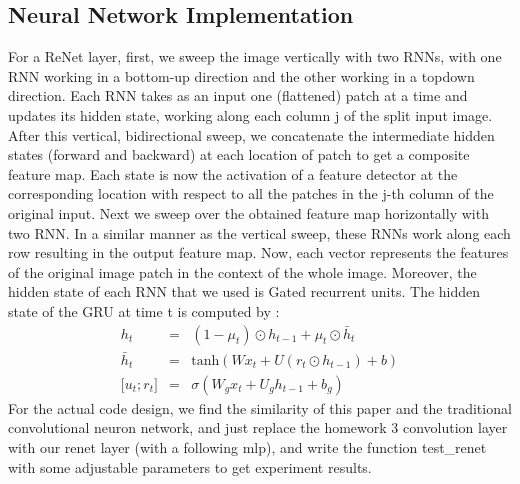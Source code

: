 \documentclass[final,leqno]{siamltex}
\begin{document}
\subsection{Neural Network Implementation}
For a ReNet layer, first, we sweep the image vertically with two RNNs, with one RNN working in a bottom-up direction and the other working in a topdown direction. Each RNN takes as an input one (flattened) patch at a time and updates its hidden state, working along each column j of the split input image. After this vertical, bidirectional sweep, we concatenate the intermediate hidden states (forward and backward) at each location of patch to get a composite feature map. Each state is now the activation of a feature detector at the corresponding location with respect to all the patches in the j-th column of the original input. Next we sweep over the obtained feature map horizontally with two RNN. In a similar manner as the vertical sweep, these RNNs work along each row resulting in the output feature map. Now, each vector represents the features of the original image patch in the context of the whole image. Moreover, the hidden state of each RNN that we used is Gated recurrent units. The hidden state of the GRU at time t is computed by \cite{DBLP:journals/corr/ChoMGBSB14}:
\begin{eqnarray*}
	h_t &=& (1-\mu_t)\odot h_{t-1}+\mu_t\odot \bar h_t\\
	\bar h_t &=& \text{tanh} (Wx_t+U(r_t \odot h_{t-1})+b)\\
	\lbrack u_t;r_t \rbrack &=& \sigma(W_g x_t+U_g h_{t-1}+b_g)
\end{eqnarray*}
For the actual code design, we find the similarity of this paper and the traditional convolutional neuron network, and just replace the homework 3 convolution layer with our renet layer (with a following mlp), and write the function test\_renet with some adjustable parameters to get experiment results.
\end{document}
